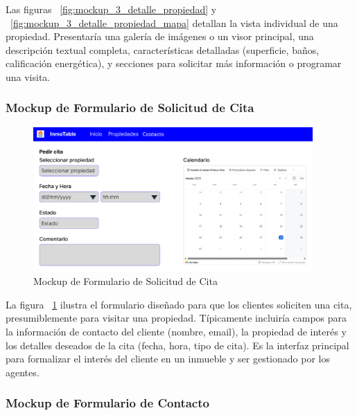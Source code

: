 Las figuras ~\ref{fig:mockup_3_detalle_propiedad} y ~\ref{fig:mockup_3_detalle_propiedad_mapa} detallan la vista individual de una propiedad. Presentaría una galería de imágenes o un visor principal, una descripción textual completa, características detalladas (superficie, baños, calificación energética), y secciones para solicitar más información o programar una visita.

\subsubsection{Mockup de Formulario de Solicitud de Cita}

\begin{figure}[H]
    \begin{center}
        \includegraphics[width = 0.95\textwidth]{Figuras/mockup_4_pedir_cita.png}
    \end{center}
    \caption{\label{fig:mockup_4_pedir_cita} Mockup de Formulario de Solicitud de Cita}
\end{figure}

La figura ~\ref{fig:mockup_4_pedir_cita} ilustra el formulario diseñado para que los clientes soliciten una cita, presumiblemente para visitar una propiedad. Típicamente incluiría campos para la información de contacto del cliente (nombre, email), la propiedad de interés y los detalles deseados de la cita (fecha, hora, tipo de cita). Es la interfaz principal para formalizar el interés del cliente en un inmueble y ser gestionado por los agentes.


\subsubsection{Mockup de Formulario de Contacto}

